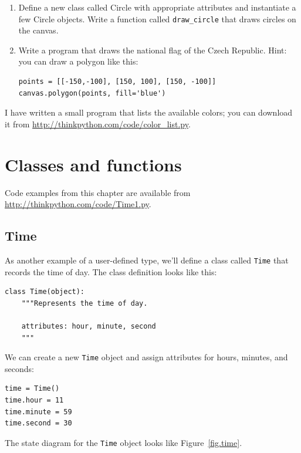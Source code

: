 \documentclass[10pt]{book}
\begin{document}
\begin{CJK}{UTF8}{gbsn}
\begin{exercise}
\begin{enumerate}
\item Define a new class called Circle with appropriate attributes and
  instantiate a few Circle objects.  Write a function called
  \verb"draw_circle" that draws circles on the canvas.

\item Write a program that draws the national flag of the Czech Republic.
Hint: you can draw a polygon like this:

\begin{verbatim}
points = [[-150,-100], [150, 100], [150, -100]]
canvas.polygon(points, fill='blue')
\end{verbatim}

\end{enumerate}

I have written a small program that lists the available colors;
you can download it from \url{http://thinkpython.com/code/color_list.py}.

\end{exercise}


\chapter{Classes and functions}
\label{time}

Code examples from this chapter are available from
\url{http://thinkpython.com/code/Time1.py}.

\section{Time}
\label{time.object}

As another example of a user-defined type, we'll define a class called
{\tt Time} that records the time of day.  The class definition looks
like this:

\begin{verbatim}
class Time(object):
    """Represents the time of day.
       
    attributes: hour, minute, second
    """
\end{verbatim}
%
We can create a new {\tt Time} object and assign
attributes for hours, minutes, and seconds:

\begin{verbatim}
time = Time()
time.hour = 11
time.minute = 59
time.second = 30
\end{verbatim}
%
The state diagram for the {\tt Time} object looks like Figure~\ref{fig.time}.


\end{CJK}
\end{document}
